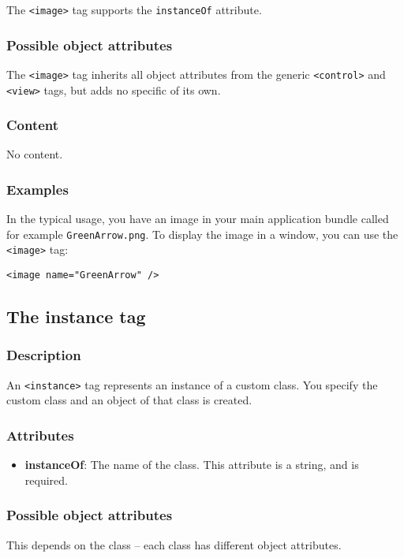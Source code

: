 The \texttt{<image>} tag supports the \texttt{instanceOf} attribute.

\subsubsection{Possible object attributes}
The \texttt{<image>} tag inherits all object attributes from the
generic \texttt{<control>} and \texttt{<view>} tags, but adds no
specific of its own.

\subsubsection{Content}
No content.

\subsubsection{Examples}
In the typical usage, you have an image in your main application
bundle called for example \texttt{GreenArrow.png}.  To display the
image in a window, you can use the \texttt{<image>} tag:
\begin{verbatim}
<image name="GreenArrow" />
\end{verbatim}

\subsection{The instance tag}

\subsubsection{Description}
An \texttt{<instance>} tag represents an instance of a custom class.  You
specify the custom class and an object of that class is created.

\subsubsection{Attributes}
\begin{itemize}
\item {\bf instanceOf}: The name of the class.  This attribute is a string, 
and is required.
\end{itemize}

\subsubsection{Possible object attributes}
This depends on the class -- each class has different object attributes.


